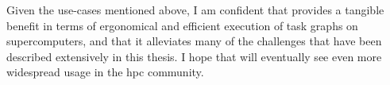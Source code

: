 Given the use-cases mentioned above, I am confident that \hyperqueue{} provides a
tangible benefit in terms of ergonomical and efficient execution of task graphs on supercomputers,
and that it alleviates many of the challenges that have been described extensively in this thesis.
I hope that \hyperqueue{} will eventually see even more widespread usage in the
\gls{hpc} community.
